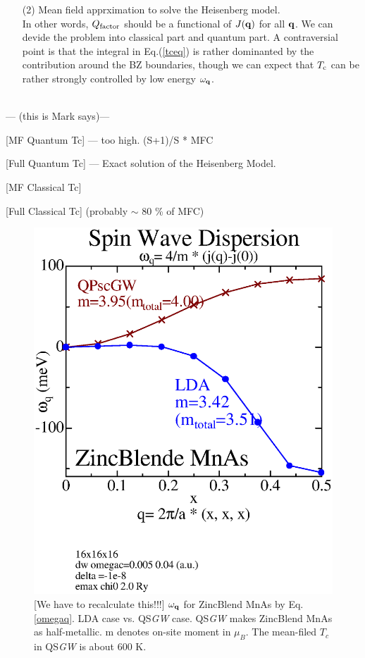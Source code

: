 \documentclass[a4paper,10pt,epsf,fleqn]{article}
\newcommand{\bfq}{{\bf q}}
\newcommand{\scgw}{QS{\it GW} }
\newcommand{\req}[1]{Eq.(\ref{#1})}
\begin{document}
{{{\begin{enumerate}
\item[(2)] Mean field apprximation to solve the Heisenberg model.\\ 
In other words, $Q_{\rm factor}$ should be a functional of $J(\bfq)$ for all $\bfq$.
We can devide the problem into classical part and quantum part.
A contraversial point is that the integral in \req{tceq} 
is rather dominanted by the contribution around the BZ boundaries,
though we can expect that $T_{\rm c}$ can be rather strongly controlled
by low energy $\omega_\bfq$. 

\end{enumerate}

~\\

--- (this is Mark says)---

[MF Quantum Tc] --- too high.  (S+1)/S * MFC

[Full Quantum Tc] --- Exact solution of the Heisenberg Model.

[MF Classical Tc] 

[Full Classical Tc] (probably $\sim$ 80 \% of MFC)



\newpage
\begin{figure}[hbpt]
\begin{center}
\vspace{-3cm}
\includegraphics[width=12cm]{ZBmnasw1.eps}
\end{center}
\caption[]{
[{\Large We have to recalculate this!!!}]
$\omega_\bfq$ for ZincBlend MnAs by Eq.\ref{omegaq}. 
LDA case vs. \scgw case. 
\scgw makes ZincBlend MnAs as half-metallic. 
m denotes on-site moment in $\mu_B$. 
The mean-filed $T_c$ in \scgw is about 600 K.}
\label{zbmnas}
\end{figure}




}}}
\end{document}
